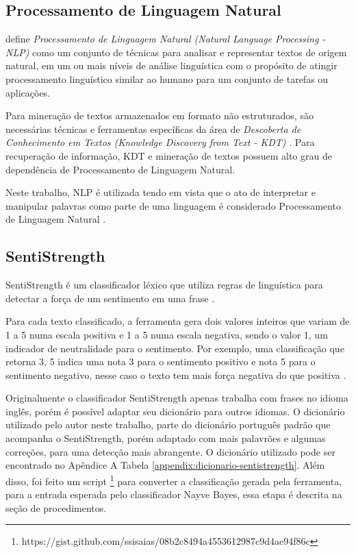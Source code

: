 \subsection{Processamento de Linguagem Natural}
 define \textit{Processamento de Linguagem Natural (Natural Language Processing - NLP)} como um conjunto de técnicas para analisar e representar textos de origem natural, em um ou mais níveis de análise linguística com o propósito de atingir processamento linguístico similar ao humano para um conjunto de tarefas ou aplicações. 

Para mineração de textos armazenados em formato não estruturados, são necessárias técnicas e ferramentas específicas da área de \textit{Descoberta de Conhecimento em Textos (Knowledge Discovery from Text - KDT)} \cite{morais2007mineraccao}. Para recuperação de informação, KDT e mineração de textos possuem alto grau de dependência de Processamento de Linguagem Natural.

Neste trabalho, NLP é utilizada tendo em vista que o ato de interpretar e manipular palavras como parte de uma linguagem é considerado Processamento de Linguagem Natural \cite{morais2007mineraccao}.


\subsection{SentiStrength}
SentiStrength é um classificador léxico que utiliza regras de linguística para detectar a força de um sentimento em uma frase \cite{thelwall2012sentistrength}.

Para cada texto classificado, a ferramenta gera dois valores inteiros que variam de 1 a 5 numa escala positiva e 1 a 5 numa escala negativa, sendo o valor 1, um indicador de neutralidade para o sentimento. Por exemplo, uma classificação que retorna 3, 5 indica uma nota 3 para o sentimento positivo e nota 5 para o sentimento negativo, nesse caso o texto tem mais força negativa do que positiva \cite{thelwall2012sentistrength}.

Originalmente o classificador SentiStrength apenas trabalha com frases no idioma inglês, porém é possível adaptar seu dicionário para outros idiomas. O dicionário utilizado pelo autor neste trabalho, parte do dicionário português padrão que acompanha o SentiStrength, porém adaptado com mais palavrões e algumas correções, para uma detecção mais abrangente. O dicionário utilizado pode ser encontrado no Apêndice A Tabela \ref{appendix:dicionario-sentistrength}. Além disso, foi feito um script \footnote{https://gist.github.com/ssisaias/08b2c8494a4553612987c9d4ae94f86c} para converter a classificação gerada pela ferramenta, para a entrada esperada pelo classificador Nayve Bayes, essa etapa é descrita na seção de procedimentos.

